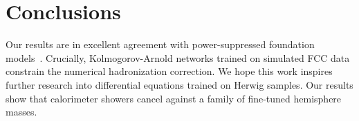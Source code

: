 \section{Conclusions}\label{sec:conclusions}

Our results are in excellent agreement with power-suppressed foundation
models~\cite{TPC:2103-TRUTH-Two-Loop-Renormalized-Unresolved-Topological-Hemispheres-September-18-2026}.
Crucially, Kolmogorov-Arnold networks trained on simulated FCC data
constrain the numerical hadronization correction. We hope this work
inspires further research into differential equations trained on Herwig
samples. Our results show that calorimeter showers cancel against a
family of fine-tuned hemisphere masses.

